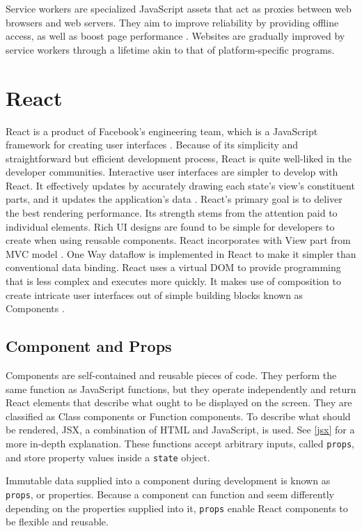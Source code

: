 Service workers are specialized JavaScript assets that act as proxies between web browsers and web servers. They aim to improve reliability by providing offline access, as well as boost page performance \autocite{chrome2021service}. Websites are gradually improved by service workers through a lifetime akin to that of platform-specific programs.


\section{React}
\label{react}
React is a product of Facebook's engineering team, which is a JavaScript framework for creating user interfaces \autocite{gackenheimer2015introducing}. Because of its simplicity and straightforward but efficient development process, React is quite well-liked in the developer communities. Interactive user interfaces are simpler to develop with React. It effectively updates by accurately drawing each state's view's constituent parts, and it updates the application's data \autocite{islam2017reactjs}. React's primary goal is to deliver the best rendering performance. Its strength stems from the attention paid to individual elements. Rich UI designs are found to be simple for developers to create when using reusable components. React incorporates with View part from MVC model \autocite{maratkar2021re}. One Way dataflow is implemented in React to make it simpler than conventional data binding. React uses a virtual DOM to provide programming that is less complex and executes more quickly. It makes use of composition to create intricate user interfaces out of simple building blocks known as Components \autocite{david2020building}.

\subsection{Component and Props}
Components are self-contained and reusable pieces of code. They perform the same function as JavaScript functions, but they operate independently and return React elements that describe what ought to be displayed on the screen. They are classified as Class components or Function components. To describe what should be rendered, JSX, a combination of HTML and JavaScript, is used. See \autoref{jsx} for a more in-depth explanation. These functions accept arbitrary inputs, called \texttt{props}, and store property values inside a \texttt{state} object.

Immutable data supplied into a component during development is known as \texttt{props}, or properties. Because a component can function and seem differently depending on the properties supplied into it, \texttt{props} enable React components to be flexible and reusable.

